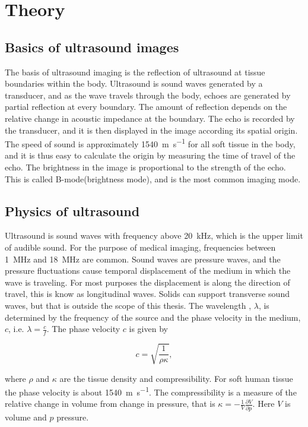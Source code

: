 \section{Theory}
\subsection{Basics of ultrasound images}
The basis of ultrasound imaging is the reflection of ultrasound at tissue boundaries within the body. Ultrasound is sound waves generated by a transducer, and as the wave travels through the body, echoes are generated by partial reflection at every boundary. The amount of reflection depends on the relative change in acoustic impedance at the boundary. The echo is recorded by the transducer, and it is then displayed in the image according its spatial origin. The speed of sound is approximately \SI{1540}{\metre\per\second} for all soft tissue in the body, and it is thus easy to calculate the origin by measuring the time of travel of the echo. The brightness in the image is proportional to the strength of the echo. This is called B-mode(brightness mode), and is the most common imaging mode. 

\subsection{Physics of ultrasound}
Ultrasound is sound waves with frequency above \SI{20}{\kilo\hertz}, which is the upper limit of audible sound. For the purpose of medical imaging, frequencies between \SI{1}{\mega\hertz} and \SI{18}{\mega\hertz} are common. Sound waves are pressure waves, and the pressure fluctuations cause temporal displacement of the medium in which the wave is traveling. For most purposes the displacement is along the direction of travel, this is know as longitudinal waves. Solids can support transverse sound waves, but that is outside the scope of this thesis.  The wavelength , $\lambda$, is determined by the frequency of the source and the phase velocity in the medium, $c$, i.e. $\lambda= \frac{c}{f}$. The phase velocity $c$ is given by

\begin{equation}
\label{phace velocity}
c = \sqrt{\frac{1}{\rho \kappa}},
\end{equation}

where $\rho$ and $\kappa$ are the tissue density and compressibility. For soft human tissue the phase velocity is about \SI{1540}{\metre\per\second}.%
The compressibility is a measure of the relative change in volume from change in pressure, that is $\kappa = -\frac{1}{V}\frac{\partial V}{\partial p}$. Here $V$ is volume and $p$ pressure. 

